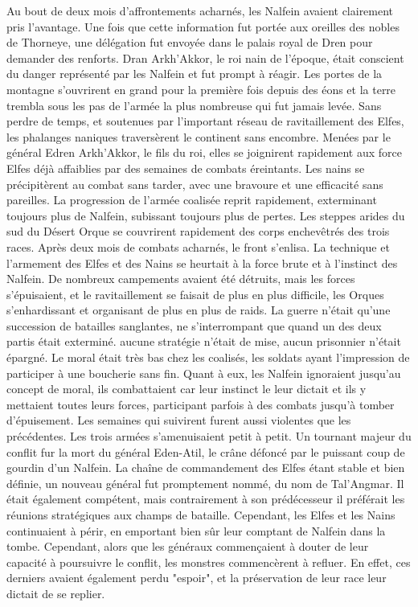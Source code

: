 \newline
Au bout de deux mois d'affrontements acharnés, les Nalfein avaient clairement pris l'avantage. Une fois que cette information fut portée aux oreilles des nobles de Thorneye, une délégation fut envoyée dans le palais royal de Dren pour demander des renforts. Dran Arkh'Akkor, le roi nain de l'époque, était conscient du danger représenté par les Nalfein et fut prompt à réagir. Les portes de la montagne s'ouvrirent en grand pour la première fois depuis des éons et la terre trembla sous les pas de l'armée la plus nombreuse qui fut jamais levée. Sans perdre de temps, et soutenues par l'important réseau de ravitaillement des Elfes, les phalanges naniques traversèrent le continent sans encombre. Menées par le général Edren Arkh'Akkor, le fils du roi, elles se joignirent rapidement aux force Elfes déjà affaiblies par des semaines de combats éreintants. Les nains se précipitèrent au combat sans tarder, avec une bravoure et une efficacité sans pareilles. La progression de l'armée coalisée reprit rapidement, exterminant toujours plus de Nalfein, subissant toujours plus de pertes. Les steppes arides du sud du Désert Orque se couvrirent rapidement des corps enchevêtrés des trois races.
\newline
Après deux mois de combats acharnés, le front s'enlisa. La technique et l'armement des Elfes et des Nains se heurtait à la force brute et à l'instinct des Nalfein. De nombreux campements avaient été détruits, mais les forces s'épuisaient, et le ravitaillement se faisait de plus en plus difficile, les Orques s'enhardissant et organisant de plus en plus de raids. La guerre n'était qu'une succession de batailles sanglantes, ne s'interrompant que quand un des deux partis était exterminé. aucune stratégie n'était de mise, aucun prisonnier n'était épargné. Le moral était très bas chez les coalisés, les soldats ayant l'impression de participer à une boucherie sans fin. Quant à eux, les Nalfein ignoraient jusqu'au concept de moral, ils combattaient car leur instinct le leur dictait et ils y mettaient toutes leurs forces, participant parfois à des combats jusqu'à tomber d'épuisement.
\newline
Les semaines qui suivirent furent aussi violentes que les précédentes. Les trois armées s'amenuisaient petit à petit. Un tournant majeur du conflit fur la mort du général Eden-Atil, le crâne défoncé par le puissant coup de gourdin d'un Nalfein. La chaîne de commandement des Elfes étant stable et bien définie, un nouveau général fut promptement nommé, du nom de Tal'Angmar. Il était également compétent, mais contrairement à son prédécesseur il préférait les réunions stratégiques aux champs de bataille. Cependant, les Elfes et les Nains continuaient à périr, en emportant bien sûr leur comptant de Nalfein dans la tombe. Cependant, alors que les généraux commençaient à douter de leur capacité à poursuivre le conflit, les monstres commencèrent à refluer. En effet, ces derniers avaient également perdu "espoir", et la préservation de leur race leur dictait de se replier.
